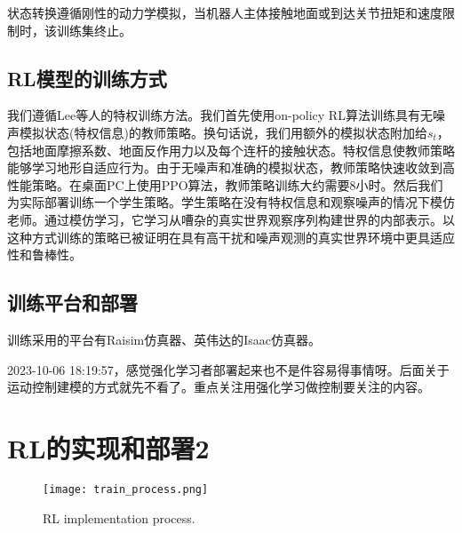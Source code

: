 状态转换遵循刚性的动力学模拟，当机器人主体接触地面或到达关节扭矩和速度限制时，该训练集终止。

\subsection{RL模型的训练方式}

我们遵循Lee等人\cite{Lee_Hwangbo_Wellhausen_Koltun_Hutter_2020}的特权训练方法。我们首先使用on-policy RL算法\cite{Schulman_Wolski_Dhariwal_Radford_Klimov_2017}训练具有无噪声模拟状态(特权信息)的教师策略。换句话说，我们用额外的模拟状态附加给$s_t$，包括地面摩擦系数、地面反作用力以及每个连杆的接触状态。特权信息使教师策略能够学习地形自适应行为。由于无噪声和准确的模拟状态，教师策略快速收敛到高性能策略。在桌面PC上使用PPO算法\cite{Schulman_Wolski_Dhariwal_Radford_Klimov_2017}，教师策略训练大约需要8小时。然后我们为实际部署训练一个学生策略。学生策略在没有特权信息和观察噪声的情况下模仿老师。通过模仿学习\cite{Ross_Gordon_Bagnell_2010}，它学习从嘈杂的真实世界观察序列构建世界的内部表示。以这种方式训练的策略已被证明在具有高干扰和噪声观测的真实世界环境中更具适应性和鲁棒性\cite{Lee_Hwangbo_Wellhausen_Koltun_Hutter_2020}。

\subsection{训练平台和部署}

训练采用的平台有Raisim\cite{Hwangbo_Lee_Hutter_2018, Lee_Bjelonic_Hutter_2023}仿真器、英伟达的Isaac\cite{Rudin_Hoeller_Reist_Hutter_2021}仿真器。

\begin{note}
    2023-10-06 18:19:57，感觉强化学习者部署起来也不是件容易得事情呀。后面关于运动控制建模的方式就先不看了。重点关注用强化学习做控制要关注的内容。
\end{note}


\section[RL的实现和部署2]{RL的实现和部署2\cite[p10-12]{Miki_Lee_Hwangbo_Wellhausen_Koltun_Hutter_2022}}


\begin{figure}
  \centering
  \texttt{[image: train\_process.png]}
  \caption{RL implementation process\cite[p9]{Miki_Lee_Hwangbo_Wellhausen_Koltun_Hutter_2022}.}
  \label{fig:process}
\end{figure}


